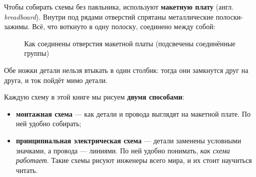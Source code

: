 Чтобы собирать схемы без паяльника, используют \textbf{макетную плату} (англ. \emph{breadboard}). Внутри
под рядами отверстий спрятаны металлические полоски-зажимы. Всё, что воткнуто в одну полоску,
соединено между собой:

\begin{figure}[H]
\centering
{}
\caption{Как соединены отверстия макетной платы (подсвечены соединённые группы)}
\end{figure}

\begin{caution}
Обе ножки детали нельзя втыкать в один столбик: тогда они замкнутся друг на друга, и ток пойдёт мимо детали.
\end{caution}

Каждую схему в этой книге мы рисуем \textbf{двумя способами}:
\begin{itemize}
  \item \textbf{монтажная схема} --- как детали и провода выглядят на макетной плате. По ней удобно собирать;
  \item \textbf{принципиальная электрическая схема} --- детали заменены условными значками, а
        провода --- линиями. По ней удобно понимать, \emph{как схема работает}. Такие схемы рисуют
        инженеры всего мира, и их стоит научиться читать.
\end{itemize}

